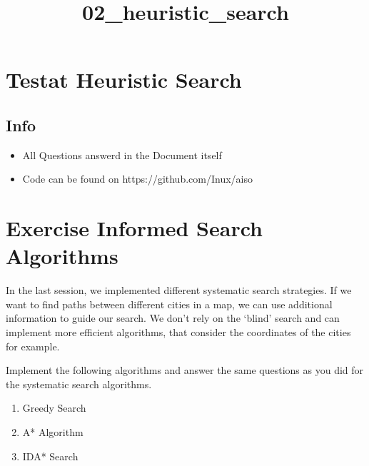 \documentclass[11pt]{article}
\title{02\_heuristic\_search}
\providecommand{\tightlist}{%
      \setlength{\itemsep}{0pt}\setlength{\parskip}{0pt}}
\begin{document}
    
    
    \maketitle
    
    

    
    \hypertarget{testat-heuristic-search}{%
\section{Testat Heuristic Search}\label{testat-heuristic-search}}

\hypertarget{info}{%
\subsection{Info}\label{info}}

\begin{itemize}
\tightlist
\item
  All Questions answerd in the Document itself
\item
  Code can be found on https://github.com/Inux/aiso
\end{itemize}

    \hypertarget{exercise-informed-search-algorithms}{%
\section{Exercise Informed Search
Algorithms}\label{exercise-informed-search-algorithms}}

    In the last session, we implemented different systematic search
strategies. If we want to find paths between different cities in a map,
we can use additional information to guide our search. We don't rely on
the `blind' search and can implement more efficient algorithms, that
consider the coordinates of the cities for example.

    Implement the following algorithms and answer the same questions as you
did for the systematic search algorithms.

\begin{enumerate}
\def\labelenumi{\arabic{enumi}.}
\tightlist
\item
  Greedy Search
\item
  A* Algorithm
\item
  IDA* Search
\end{enumerate}
\end{document}
